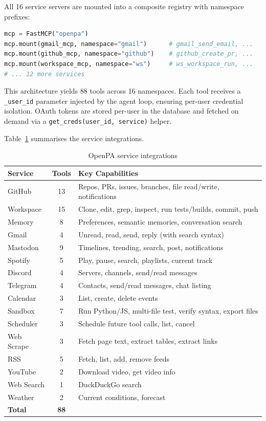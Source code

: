 All 16 service servers are mounted into a composite registry with namespace prefixes:

\begin{lstlisting}[language=Python, caption={Tool registry mounting}]
mcp = FastMCP("openpa")
mcp.mount(gmail_mcp, namespace="gmail")      # gmail_send_email, ...
mcp.mount(github_mcp, namespace="github")    # github_create_pr, ...
mcp.mount(workspace_mcp, namespace="ws")     # ws_workspace_run, ...
# ... 12 more services
\end{lstlisting}

This architecture yields 88 tools across 16 namespaces. Each tool receives a \texttt{\_user\_id} parameter injected by the agent loop, ensuring per-user credential isolation. OAuth tokens are stored per-user in the database and fetched on demand via a \texttt{get\_creds(user\_id, service)} helper.

Table~\ref{tab:services} summarises the service integrations.

\begin{table}[H]
\centering
\caption{OpenPA service integrations}
\label{tab:services}
\small
\begin{tabularx}{\textwidth}{l|c|X}
\toprule
\textbf{Service} & \textbf{Tools} & \textbf{Key Capabilities} \\
\midrule
GitHub      & 13 & Repos, PRs, issues, branches, file read/write, notifications \\
Workspace   & 15 & Clone, edit, grep, inspect, run tests/builds, commit, push \\
Memory      &  8 & Preferences, semantic memories, conversation search \\
Gmail       &  4 & Unread, read, send, reply (with search syntax) \\
Mastodon    &  9 & Timelines, trending, search, post, notifications \\
Spotify     &  5 & Play, pause, search, playlists, current track \\
Discord     &  4 & Servers, channels, send/read messages \\
Telegram    &  4 & Contacts, send/read messages, chat listing \\
Calendar    &  3 & List, create, delete events \\
Sandbox     &  7 & Run Python/JS, multi-file test, verify syntax, export files \\
Scheduler   &  3 & Schedule future tool calls, list, cancel \\
Web Scrape  &  3 & Fetch page text, extract tables, extract links \\
RSS         &  5 & Fetch, list, add, remove feeds \\
YouTube     &  2 & Download video, get video info \\
Web Search  &  1 & DuckDuckGo search \\
Weather     &  2 & Current conditions, forecast \\
\midrule
\textbf{Total} & \textbf{88} & \\
\bottomrule
\end{tabularx}
\end{table}

